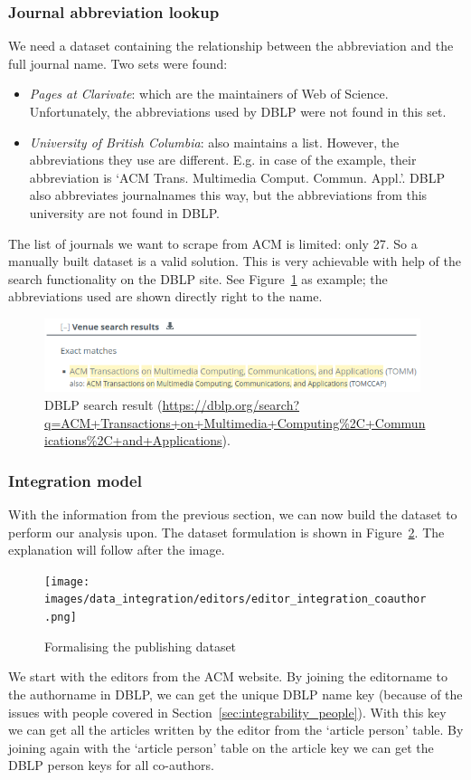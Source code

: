 \documentclass{ou-report}
\newcommand{\dblp}{DBLP}
\begin{document}
\subsubsection{Journal abbreviation lookup}
We need a dataset containing the relationship between the abbreviation and the
full journal name. Two sets were found:
\begin{itemize}
    \item \emph{Pages at Clarivate}: which are the maintainers of Web of
    Science. Unfortunately, the abbreviations used by \dblp{} were not found in
    this set.
    \item \emph{University of British Columbia}: also maintains a list. However,
    the abbreviations they use are different. E.g. in case of the example, their
    abbreviation is `ACM Trans. Multimedia Comput. Commun. Appl.'. \dblp{}
    also abbreviates journalnames this way, but the 
    abbreviations from this university are not found in \dblp{}.
\end{itemize}
The list of journals we want to scrape from ACM is limited: only 27. So
a manually built dataset is a valid solution. This is very achievable 
with help of the search functionality on the \dblp{} site. See 
Figure~\ref{fig:dblp_search_result} as example; the abbreviations used are shown
directly right to the name.
\begin{figure}[H]
\centering
\includegraphics[width=11cm]{images/dblp_search_result.png}
\caption{DBLP search result (\url{https://dblp.org/search?q=ACM+Transactions+on+Multimedia+Computing\%2C+Communications\%2C+and+Applications}).}
\label{fig:dblp_search_result}
\end{figure}
\subsubsection{Integration model}
With the information from the previous section, we can now build the dataset to
perform our analysis upon. The dataset formulation is shown in 
Figure~\ref{fig:editors_integration_coauthor}. The explanation will follow 
after the image.
\begin{figure}[H]
    \centering
    \texttt{[image: images/data\_integration/editors/editor\_integration\_coauthor.png]}
    \caption{Formalising the publishing dataset}
    \label{fig:editors_integration_coauthor}
\end{figure}
We start with the editors from the ACM website. By joining the editorname 
to the authorname in DBLP, we can get the unique DBLP name key (because of the 
issues with people covered in Section~\ref{sec:integrability_people}). With this 
key we can get all the articles written by the editor from the `article person'
table. By joining again with the `article person' table on the article key we 
can get the DBLP person keys for all co-authors.
\end{document}

